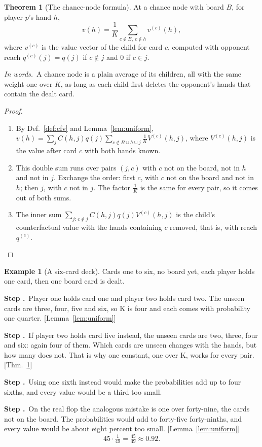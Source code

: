 \documentclass[11pt]{article}
\theoremstyle{definition}
\newtheorem{example}[definition]{Example}
\newtheorem{theorem}[definition]{Theorem}
\newcommand{\inwords}{\par\smallskip\noindent\textit{In words.}\ }
\newcounter{stp}
\newcommand{\steps}{\setcounter{stp}{0}}
\newcommand{\st}{\stepcounter{stp}\par\medskip\noindent\textbf{Step \arabic{stp}.}\ }
\newcommand{\by}[1]{\hfill{\small\color{blue!50!black}[#1]}}
\newcommand{\Def}[1]{Def.~\ref{#1}}\newcommand{\Lem}[1]{Lemma~\ref{#1}}\newcommand{\Thm}[1]{Thm.~\ref{#1}}
\begin{document}
\begin{theorem}[The chance-node formula]\label{thm:chance}
At a chance node with board $B$, for player $p$'s hand $h$,
\[ v(h)=\frac1K\sum_{c\notin B,\ c\notin h}v^{(c)}(h), \]
where $v^{(c)}$ is the value vector of the child for card $c$, computed with opponent reach $q^{(c)}(j)=q(j)$ if $c\notin j$ and
$0$ if $c\in j$.
\inwords A chance node is a plain average of its children, all with the same weight one over $K$, as long as each child
first deletes the opponent's hands that contain the dealt card.
\end{theorem}
\begin{proof}
\begin{enumerate}[nosep]
\item By \Def{def:cfv} and \Lem{lem:uniform}, $v(h)=\sum_jC(h,j)q(j)\sum_{c\notin B\cup h\cup j}\tfrac1KV^{(c)}(h,j)$, where $V^{(c)}(h,j)$ is the
value after card $c$ with both hands known.
\item This double sum runs over pairs $(j,c)$ with $c$ not on the board, not in $h$ and not in $j$. Exchange the order:
first $c$, with $c$ not on the board and not in $h$; then $j$, with $c$ not in $j$. The factor $\tfrac1K$ is the same
for every pair, so it comes out of both sums.
\item The inner sum $\sum_{j:\,c\notin j}C(h,j)q(j)V^{(c)}(h,j)$ is the child's counterfactual value with the hands containing $c$
removed, that is, with reach $q^{(c)}$.\qedhere
\end{enumerate}
\end{proof}

\begin{example}[A six-card deck]\label{ex:sixcard}
Cards one to six, no board yet, each player holds one card, then one board card is dealt.
\steps
\st Player one holds card one and player two holds card two. The unseen cards are three, four, five and six, so K is four
and each comes with probability one quarter. \by{\Lem{lem:uniform}}
\st If player two holds card five instead, the unseen cards are two, three, four and six: again four of them. Which cards
are unseen changes with the hands, but how many does not. That is why one constant, one over K, works for every pair.
\by{\Thm{thm:chance}}
\st Using one sixth instead would make the probabilities add up to four sixths, and every value would be a third too
small.
\st On the real flop the analogous mistake is one over forty-nine, the cards not on the board. The probabilities would add
to forty-five forty-ninths, and every value would be about eight percent too small. \by{\Lem{lem:uniform}}
\[ 45\cdot\tfrac1{49}=\tfrac{45}{49}\approx0.92. \]
\end{example}
\end{document}
